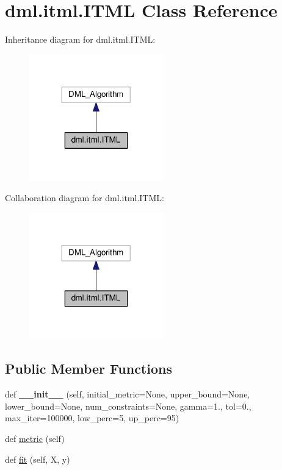 \hypertarget{classdml_1_1itml_1_1ITML}{}\section{dml.\+itml.\+I\+T\+ML Class Reference}
\label{classdml_1_1itml_1_1ITML}


Inheritance diagram for dml.\+itml.\+I\+T\+ML\+:
\nopagebreak
\begin{figure}[H]
\begin{center}
\leavevmode
\includegraphics[width=164pt]{classdml_1_1itml_1_1ITML__inherit__graph}
\end{center}
\end{figure}


Collaboration diagram for dml.\+itml.\+I\+T\+ML\+:
\nopagebreak
\begin{figure}[H]
\begin{center}
\leavevmode
\includegraphics[width=164pt]{classdml_1_1itml_1_1ITML__coll__graph}
\end{center}
\end{figure}
\subsection*{Public Member Functions}
\begin{DoxyCompactItemize}
\item 
def {\bfseries \+\_\+\+\_\+init\+\_\+\+\_\+} (self, initial\+\_\+metric=None, upper\+\_\+bound=None, lower\+\_\+bound=None, num\+\_\+constraints=None, gamma=1., tol=0., max\+\_\+iter=100000, low\+\_\+perc=5, up\+\_\+perc=95)\hypertarget{classdml_1_1itml_1_1ITML_adf50511395db38402d68aeb8d4c8bc95}{}\label{classdml_1_1itml_1_1ITML_adf50511395db38402d68aeb8d4c8bc95}

\item 
def \hyperlink{classdml_1_1itml_1_1ITML_abbd45935d0afe4701144295ef869b9f0}{metric} (self)
\item 
def \hyperlink{classdml_1_1itml_1_1ITML_aec44a9262788d7af9b250fbab7b6e7d5}{fit} (self, X, y)
\end{DoxyCompactItemize}
